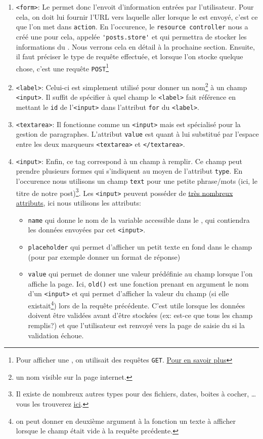 \documentclass[internal]{nhitec_design}
\begin{document}
\begin{enumerate}
    \item \verb|<form>|: Le \form{} permet donc l'envoit d'information entrées par l'utilisateur. Pour cela, on doit lui fournir l'URL vers laquelle aller lorsque le \form{} est envoyé, c'est ce que l'on met dans \verb|action|. En l'occurence, le \texttt{resource controller} nous a créé une \route{} pour cela, appelée \verb|'posts.store'| et qui permettra de stocker les informations du \form{}. Nous verrons cela en détail à la prochaine section. Ensuite, il faut préciser le type de requête effectuée, et lorsque l'on stocke quelque chose, c'est une requête \verb|POST|\footnote{Pour afficher une \blade, on utilisait des requêtes \verb|GET|. \href{https://developer.mozilla.org/fr/docs/Web/HTTP/Methods}{Pour en savoir plus}}
    \item \verb|<label>|: Celui-ci est simplement utilisé pour donner un nom\footnote{un nom visible sur la page internet.} à un champ \verb|<input>|. Il suffit de spécifier à quel champ le \verb|<label>| fait référence en mettant le \verb|id| de l'\verb|<input>| dans l'attribut \verb|for| du \verb|<label>|.
    \item \verb|<textarea>|: Il fonctionne comme un \verb|<input>| mais est spécialisé pour la gestion de paragraphes. L'attribut \verb|value| est quant à lui substitué par l'espace entre les deux marqueurs \verb|<textarea>| et \verb|</textarea>|.
    \item \verb|<input>|: Enfin, ce tag correspond à un champ à remplir. Ce champ peut prendre plusieurs formes qui s'indiquent au moyen de l'attribut \verb|type|. En l'occurence nous utilisons un champ \verb|text| pour une petite phrase/mots (ici, le titre de notre post)\footnote{Il existe de nombreux autres types pour des fichiers, dates, boites à cocher, \ldots vous les trouverez \href{https://developer.mozilla.org/en-US/docs/Web/HTML/Element/input#input_types}{ici}.}. Les \verb|<input>| peuvent posséder de \href{https://developer.mozilla.org/en-US/docs/Web/HTML/Element/input#attributes}{très nombreux attributs}, ici nous utilisons les attributs:
    \begin{itemize}
        \item \verb|name| qui donne le nom de la variable accessible dans le \controller{}, qui contiendra les données envoyées par cet \verb|<input>|.
        \item \verb|placeholder| qui permet d'afficher un petit texte en fond dans le champ (pour par exemple donner un format de réponse)
        \item \verb|value| qui permet de donner une valeur prédéfinie au champ lorsque l'on affiche la page. Ici, \verb|old()| est une fonction prenant en argument le nom d'un \verb|<input>| et qui permet d'afficher la valeur du champ (si elle existait\footnote{on peut donner en deuxième argument à la fonction un texte à afficher lorsque le champ était vide à la requête prcédente.}) lors de la requête précédente. C'est utile lorsque les données doivent être validées avant d'être stockées (ex: est-ce que tous les champ remplis?) et que l'utilisateur est renvoyé vers la page de saisie du \form{} si la validation échoue.
    \end{itemize}
\end{enumerate}
\end{document}

